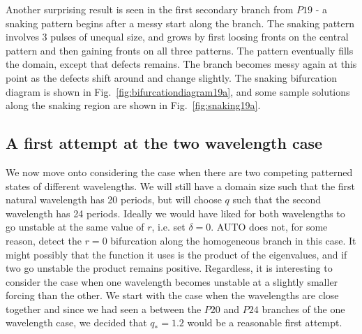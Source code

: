\documentclass[../main/WavelengthCompetition.tex]{subfiles}
\begin{document}
Another surprising result is seen in the first secondary branch from $P19$ - a snaking pattern  begins  after a messy start along the branch.  The snaking pattern involves 3 pulses of unequal size, and grows by first loosing fronts on the central pattern and then gaining fronts on all three patterns.  The pattern eventually fills the domain, except that defects remains.  The branch becomes messy again at this point as the defects shift around and change slightly.  The snaking bifurcation diagram is shown in Fig.~\ref{fig:bifurcationdiagram19a}, and some sample solutions along the snaking region are shown in Fig.~\ref{fig:snaking19a}.
\FIGbifurcationdiagramC
\FIGsnakingB


\subsection{A first attempt at the two wavelength case}
We now move onto considering the case when there are two competing patterned states of different wavelengths.  We will still have a domain size such that the first natural wavelength has 20 periods, but will choose $q$ such that the second wavelength has 24 periods.  Ideally we would have liked for both wavelengths to go unstable at the same value of $r$, i.e. set $\delta=0$.  AUTO does not, for some reason, detect the $r=0$ bifurcation along the homogeneous branch in this case.  It might possibly that the function it uses is the product of the eigenvalues, and if two go unstable the product remains positive.    Regardless, it is interesting to consider the case when one wavelength becomes unstable at a slightly smaller forcing than the other.  We start with the case when the wavelengths are close together and since we had seen a  between the $P20$ and $P24$ branches of the one wavelength case, we decided that $q_*=1.2$ would be a reasonable first attempt.   
\end{document}
